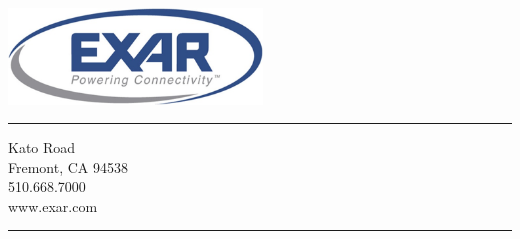 \thispagestyle{empty}

\includegraphics[width=6.75cm]{exar_logo.jpg}\\
{\color{gray}\rule{\textwidth}{1pt}}

{ Kato Road\\
  Fremont, CA 94538\\
  510.668.7000\\
  www.exar.com\\

}

{\color{gray}
  \rule{\textwidth}{1pt}\\}
\begin{flushright}
\color{ThemeColor}\bfseries\fontsize{22}{22}\selectfont{Exar Confidential}
\end{flushright}
\pagebreak




